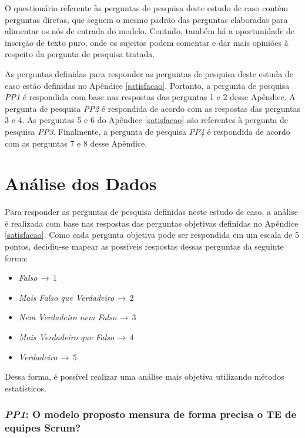 O questionário referente às perguntas de pesquisa deste estudo de caso contém perguntas diretas, que seguem o mesmo padrão das perguntas elaboradas para alimentar os nós de entrada do modelo. Contudo, também há a oportunidade de inserção de texto puro, onde os sujeitos podem comentar e dar mais opiniões à respeito da pergunta de pesquisa tratada.

As perguntas definidas para responder as perguntas de pesquisa deste estuda de caso estão definidas no Apêndice \ref{satisfacao}. Portanto, a pergunta de pesquisa \textit{PP1} é respondida com base nas respostas das perguntas 1 e 2 desse Apêndice. A pergunta de pesquisa \textit{PP2} é respondida de acordo com as respostas das perguntas 3 e 4. As perguntas 5 e 6 do Apêndice \ref{satisfacao} são referentes à pergunta de pesquisa \textit{PP3}. Finalmente, a pergunta de pesquisa \textit{PP4} é respondida de acordo com as perguntas 7 e 8 desse Apêndice.

\section{Análise dos Dados}
\label{estudodecaso:analise}

Para responder as perguntas de pesquisa definidas neste estudo de caso, a análise é realizada com base nas respostas das perguntas objetivas definidas no Apêndice \ref{satisfacao}. Como cada pergunta objetiva pode ser respondida em um escala de 5 pontos, decidiu-se mapear as possíveis respostas dessas perguntas da seguinte forma:

\begin{itemize}
  \item \textit{Falso}$\,\to\,1$
  \item \textit{Mais Falso que Verdadeiro}$\,\to\,2$
  \item \textit{Nem Verdadeiro nem Falso}$\,\to\,3$
  \item \textit{Mais Verdadeiro que Falso}$\,\to\,4$
  \item \textit{Verdadeiro}$\,\to\,5$
\end{itemize}

Dessa forma, é possível realizar uma análise mais objetiva utilizando métodos estatísticos.

\subsubsection{\textit{PP1}: O modelo proposto mensura de forma precisa o TE de equipes Scrum?}

